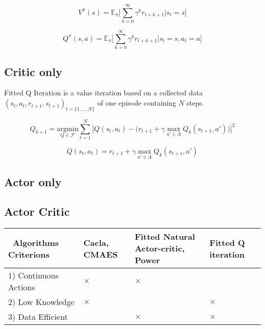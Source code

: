 \begin{equation}
 V^\pi(s) = \mathbb{E}_\pi \Big[ \sum_{k=0}^{\infty} \gamma^k r_{t+k+1} \Big| s_t = s \Big]
\end{equation}

\begin{equation}
 Q^\pi(s, a) = \mathbb{E}_\pi \Big[ \sum_{k=0}^{\infty} \gamma^k r_{t+k+1} \Big| s_t = s, a_t = a \Big]
\end{equation}


\subsection{Critic only}
Fitted Q Iteration \cite{Riedmiller2005} is a value iteration based on a collected data $(s_t, a_t,r_{t+1}, s_{t+1})_{t=\{1,...,N\}}$ of one episode containing $N$ steps.

\begin{equation}
 Q_{k+1} = \underset{Q \in \mathcal{F}}{\text{argmin}} \sum_{t=1}^{N} \Big[ Q(s_t, a_t) - \big( r_{t+1} + \gamma \underset{a' \in A}{\text{ max }} Q_k(s_{t+1}, a') \big) \Big]^2
\end{equation}

\begin{equation}
 Q(s_t, a_t) =  r_{t+1} + \gamma \underset{a' \in A}{\text{ max }} Q_k(s_{t+1}, a')
\end{equation}


\subsection{Actor only}

\subsection{Actor Critic}

\begin{tabular}{|p{3.4cm}|>{\centering\arraybackslash}p{1.2cm}|>{\centering\arraybackslash}p{3cm}|>{\centering\arraybackslash}p{1.8cm}|}
 \hline
 ~\mbox{Algorithms} ~ \mbox{Criterions} & Cacla, CMAES & Fitted Natural Actor-critic, Power & Fitted Q iteration \\ \hline
 1) Continuous Actions & $\times$ & $\times$ & \\ \hline
 2) Low Knowledge & $\times$ & & $\times$ \\ \hline
 3) Data Efficient &  & $\times$ & $\times$\\ \hline
\end{tabular}


